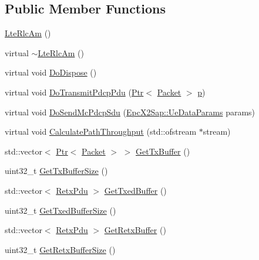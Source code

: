 \subsection*{Public Member Functions}
\begin{DoxyCompactItemize}
\item 
\hyperlink{classns3_1_1LteRlcAm_a30d50012210973b7e4deed74215f74e5}{Lte\+Rlc\+Am} ()
\item 
virtual \hyperlink{classns3_1_1LteRlcAm_acb9e58c572a7ec0a2d0c5cea1e1405f1}{$\sim$\+Lte\+Rlc\+Am} ()
\item 
virtual void \hyperlink{classns3_1_1LteRlcAm_a4feb3735466918c203800a129554173c}{Do\+Dispose} ()
\item 
virtual void \hyperlink{classns3_1_1LteRlcAm_a08891c18fe319cee6eede513a65a892b}{Do\+Transmit\+Pdcp\+Pdu} (\hyperlink{classns3_1_1Ptr}{Ptr}$<$ \hyperlink{classns3_1_1Packet}{Packet} $>$ \hyperlink{lte__link__budget__x2__handover__measures_8m_ac9de518908a968428863f829398a4e62}{p})
\item 
virtual void \hyperlink{classns3_1_1LteRlcAm_a82f906888a397ccda58483840418c7e8}{Do\+Send\+Mc\+Pdcp\+Sdu} (\hyperlink{structns3_1_1EpcX2Sap_1_1UeDataParams}{Epc\+X2\+Sap\+::\+Ue\+Data\+Params} params)
\item 
virtual void \hyperlink{classns3_1_1LteRlcAm_ab0667dd0c5a687aeb730b0cdbcf25822}{Calculate\+Path\+Throughput} (std\+::ofstream $\ast$stream)
\item 
std\+::vector$<$ \hyperlink{classns3_1_1Ptr}{Ptr}$<$ \hyperlink{classns3_1_1Packet}{Packet} $>$ $>$ \hyperlink{classns3_1_1LteRlcAm_af94b78415ed869e287cd3146d5e6c7e9}{Get\+Tx\+Buffer} ()
\item 
uint32\+\_\+t \hyperlink{classns3_1_1LteRlcAm_a237ed906980b0b5b8662f4c51c7254d1}{Get\+Tx\+Buffer\+Size} ()
\item 
std\+::vector$<$ \hyperlink{structns3_1_1LteRlcAm_1_1RetxPdu}{Retx\+Pdu} $>$ \hyperlink{classns3_1_1LteRlcAm_a6806fa73bfb0185b04cadc676011b61f}{Get\+Txed\+Buffer} ()
\item 
uint32\+\_\+t \hyperlink{classns3_1_1LteRlcAm_a508bef3518a9e4a5c91e4f4ee3dccc6f}{Get\+Txed\+Buffer\+Size} ()
\item 
std\+::vector$<$ \hyperlink{structns3_1_1LteRlcAm_1_1RetxPdu}{Retx\+Pdu} $>$ \hyperlink{classns3_1_1LteRlcAm_ad15b96910345a5887f6810ccf33808b1}{Get\+Retx\+Buffer} ()
\item 
uint32\+\_\+t \hyperlink{classns3_1_1LteRlcAm_afa556477095e8699f171d302998b899d}{Get\+Retx\+Buffer\+Size} ()
\item 

\end{DoxyCompactItemize}

